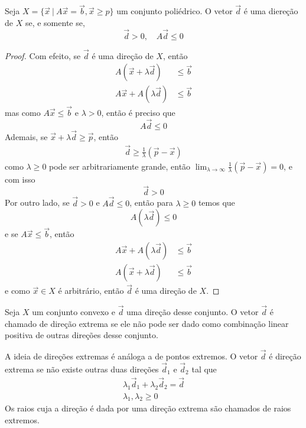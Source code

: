 \begin{prop:direção}
	Seja $X = \{\vec{x}\ |\ A\vec{x} = \vec{b}, \vec{x} \geq p\}$ um conjunto poliédrico.
	O vetor $\vec{d}$ é uma diereção de $X$ se, e somente se,
	\begin{equation*}
		\vec{d} > 0, \quad A\vec{d} \leq 0
	\end{equation*}

	\begin{proof}
		Com efeito, se $\vec{d}$ é uma direção de $X$, então
		\begin{align*}
			A (\vec{x} + \lambda \vec{d}) &\leq \vec{b} \\
			A \vec{x} + A (\lambda \vec{d}) & \leq \vec b
		\end{align*}
		mas como $A \vec{x} \leq \vec{b}$ e $\lambda > 0$, então é preciso que
		\begin{equation*}
			A\vec{d} \leq 0
		\end{equation*}
		Ademais, se $\vec{x} + \lambda \vec{d} \geq \vec p$, então
		\begin{align}
			\vec{d} \geq \frac{1}{\lambda} (\vec p - \vec{x})
		\end{align}
		como $\lambda \geq 0$ pode ser arbitrariamente grande, então
		$\lim_{\lambda \to \infty} \frac{1}{\lambda}(\vec p -\vec{x}) = 0$, e com isso
		\[\vec d > 0\]
		Por outro lado, se $\vec{d} > 0$ e $A \vec{d} \leq 0$, então para $\lambda \geq 0$ temos que
		\[A (\lambda \vec{d}) \leq 0\]
		e se $A \vec{x} \leq \vec b$, então
		\begin{align*}
			A \vec{x} + A (\lambda \vec{d}) &\leq \vec{b} \\
			A (\vec{x} + \lambda \vec{d}) &\leq \vec{b}
		\end{align*}
		e como $\vec{x} \in X$ é arbitrário, então $\vec d$ é uma direção de $X$.
	\end{proof}
\end{prop:direção}

\begin{def:direção extrema}
	Seja $X$ um conjunto convexo e $\vec{d}$ uma direção desse conjunto. O vetor
	$\vec{d}$ é chamado de direção extrema se ele não pode ser dado como combinação
	linear positiva de outras direções desse conjunto.
\end{def:direção extrema}

A ideia de direções extremas é análoga a de pontos extremos. O vetor $\vec{d}$ é
direção extrema se não existe outras duas direções $\vec{d}_1$ e $\vec{d}_2$
tal que
\begin{gather*}
	\lambda_1\vec{d}_1 + \lambda_2\vec{d}_2 = \vec{d} \\
	\lambda_1, \lambda_2 \geq 0
\end{gather*}
Os raios cuja a direção é dada por uma direção extrema são chamados de raios
extremos.

